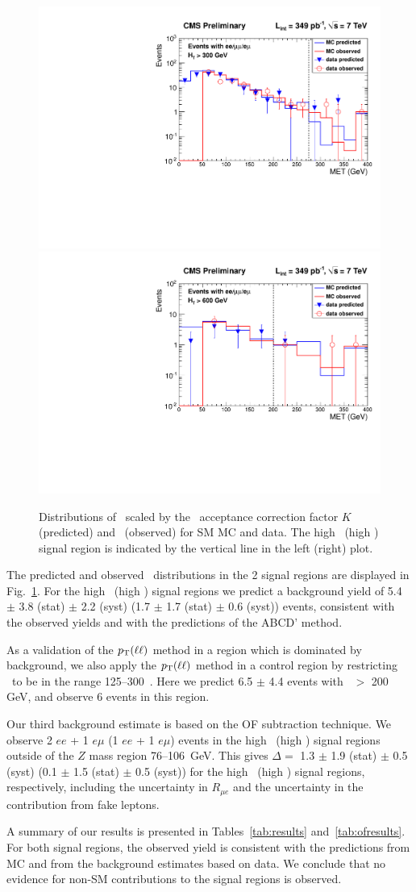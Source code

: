 \begin{figure}[hbt]
\begin{center}
\includegraphics[width=0.48\linewidth]{plots_final/victory_met275_ht300_349pb.pdf}
\includegraphics[width=0.48\linewidth]{plots_final/victory_met200_ht600_349pb.pdf}
\caption{\label{fig:victory}\protect 
Distributions of \ptll\ scaled by the \MET\ acceptance correction factor $K$ (predicted) 
and \met\ (observed) for SM MC and data. The high \MET\ (high \Ht) signal region
is indicated by the vertical line in the left (right) plot.
}
\end{center}
\end{figure}

The predicted and observed \MET\ distributions in the 2 signal regions are displayed
in Fig.~\ref{fig:victory}. For the high \MET\ (high \Ht) signal regions we predict
a background yield of 5.4 $\pm$ 3.8 (stat) $\pm$ 2.2 (syst) 
(1.7 $\pm$ 1.7 (stat) $\pm$ 0.6 (syst)) events, consistent with the observed yields
and with the predictions of the ABCD' method. 

As a validation of the $p_{\mathrm{T}}(\ell\ell)$ method in a region which is dominated by
background, we also apply the $p_{\mathrm{T}}(\ell\ell)$ method in a control region by restricting
\HT\ to be in the range 125--300~\GeV. Here we predict 6.5 $\pm$ 4.4 events with
\MET\ $>$ 200 GeV, and observe 6 events in this region.

Our third background estimate is based on the OF subtraction technique. We observe
2 $ee$ + 1 $e\mu$ (1 $ee$ + 1 $e\mu$) events in the high \MET\ (high \Ht) signal
regions outside of the $Z$ mass region 76--106~GeV. This gives 
$\Delta = $ 1.3 $\pm$ 1.9 (stat) $\pm$ 0.5 (syst) 
(0.1 $\pm$ 1.5 (stat) $\pm$ 0.5 (syst)) for the high \MET\ (high \Ht) signal regions,
respectively, including the uncertainty in $R_{\mu e}$ and the uncertainty in the
contribution from fake leptons.

A summary of our results is presented in Tables~\ref{tab:results} and~\ref{tab:ofresults}. For both signal regions,
the observed yield is consistent with the predictions from MC and from the background estimates
based on data. We conclude that no evidence for non-SM contributions to the signal regions
is observed.
